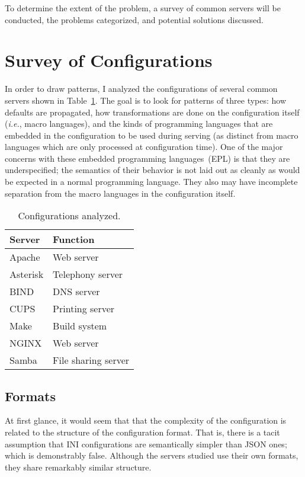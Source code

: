 \documentclass[letterpaper,twocolumn,10pt]{article}
\begin{document}
To determine the extent of the problem, a survey of common servers will be conducted, the problems categorized, and potential solutions discussed.

\section{Survey of Configurations}
In order to draw patterns, I analyzed the configurations of several common servers shown in Table~\ref{tbl:servers}. The goal is to look for patterns of three types: how defaults are propagated, how transformations are done on the configuration itself (\emph{i.e.}, macro languages), and the kinds of programming languages that are embedded in the configuration to be used during serving (as distinct from macro languages which are only processed at configuration time). One of the major concerns with these embedded programming languages~(EPL) is that they are underspecified; the semantics of their behavior is not laid out as cleanly as would be expected in a normal programming language. They also may have incomplete separation from the macro languages in the configuration itself.

\begin{table}
\caption{\label{tbl:servers} Configurations analyzed.}
\begin{tabular}{ll}
\hline
\textbf{Server} & \textbf{Function} \\
\hline
Apache & Web server \\
Asterisk & Telephony server \\
BIND & DNS server \\
CUPS & Printing server \\
Make & Build system \\
NGINX & Web server \\
Samba & File sharing server \\
\hline
\end{tabular}
\end{table}

\subsection{Formats}
At first glance, it would seem that that the complexity of the configuration is related to the structure of the configuration format. That is, there is a tacit assumption that INI configurations are semantically simpler than JSON ones; which is demonstrably false. Although the servers studied use their own formats, they share remarkably similar structure.
\end{document}
